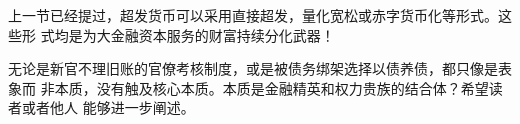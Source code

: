 上一节已经提过，超发货币可以采用直接超发，量化宽松或赤字货币化等形式。这些形
式均是为大金融资本服务的财富持续分化武器！

无论是新官不理旧账的官僚考核制度，或是被债务绑架选择以债养债，都只像是表象而
非本质，没有触及核心本质。本质是金融精英和权力贵族的结合体？希望读者或者他人
能够进一步阐述。

